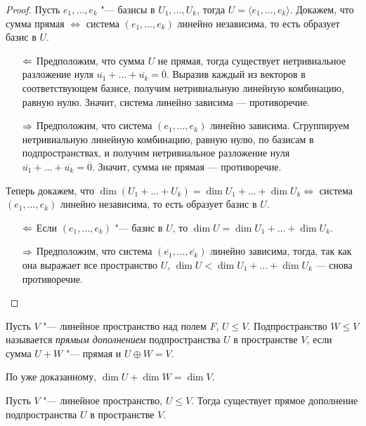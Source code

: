 \begin{proof}
	Пусть $e_1, \dotsc, e_k$ "--- базисы в $U_1, \dots, U_k$, тогда $U = \langle e_1, \dots, e_k \rangle$. Докажем, что сумма прямая $\Leftrightarrow$ система $(e_1, \dots, e_k)$ линейно независима, то есть образует базис в $U$.
	\begin{itemize}
		\item[$\Leftarrow$] Предположим, что сумма $U$ не прямая, тогда существует нетривиальное разложение нуля $\overline{u_1} + \dots + \overline{u_k} = \overline{0}$. Выразив каждый из векторов в соответствующем базисе, получим нетривиальную линейную комбинацию, равную нулю. Значит, система линейно зависима --- противоречие.
		
		\item[$\Rightarrow$] Предположим, что система $(e_1, \dots, e_k)$ линейно зависима. Сгруппируем нетривиальную линейную комбинацию, равную нулю, по базисам в подпространствах, и получим нетривиальное разложение нуля $\overline{u_1} + \dots + \overline{u_k} = \overline{0}$. Значит, сумма не прямая --- противоречие.
	\end{itemize}

	Теперь докажем, что $\dim{(U_1 + \dots + U_k)} = \dim{U_1} + \dots + \dim{U_k} \Leftrightarrow$ система $(e_1, \dots, e_k)$ линейно независима, то есть образует базис в $U$.
	\begin{itemize}
		\item[$\Leftarrow$] Если $(e_1, \dots, e_k)$ "--- базис в $U$, то $\dim{U} = \dim{U_1} + \dots + \dim{U_k}$.
		
		\item[$\Rightarrow$] Предположим, что система $(\overline{e_1}, \dots, \overline{e_k})$ линейно зависима, тогда, так как она выражает все пространство $U$, $\dim{U} < \dim{U_1} + \dots + \dim{U_k}$ --- снова противоречие.\qedhere
	\end{itemize}
\end{proof}

\begin{definition}
	Пусть $V$ "--- линейное пространство над полем $F$, $U \le V$. Подпространство $W \le V$ называется \textit{прямым дополнением} подпространства $U$ в пространстве $V$, если сумма $U + W$ "--- прямая и $U \oplus W = V$.
\end{definition}

\begin{note}
	По уже доказанному, $\dim{U} + \dim{W} = \dim{V}$.
\end{note}

\begin{proposition}
	Пусть $V$ "--- линейное пространство, $U \le V$. Тогда существует прямое дополнение подпространства $U$ в пространстве $V$.
\end{proposition}

